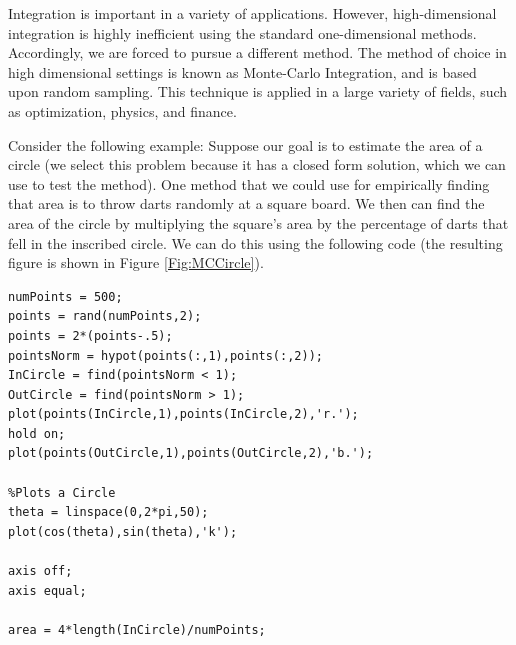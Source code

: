 


Integration is important in a variety of applications. However, high-dimensional integration is highly inefficient using the standard one-dimensional methods. Accordingly, we are forced to pursue a different method. The method of choice in high dimensional settings is known as Monte-Carlo Integration, and is based upon random sampling. This technique is applied in a large variety of fields, such as optimization, physics, and finance.

Consider the following example: Suppose our goal is to estimate the area of a circle (we select this problem because it has a closed form solution, which we can use to test the method). One method that we could use for empirically finding that area is to throw darts randomly at a square board. We then can find the area of the circle by multiplying the square's area by the percentage of darts that fell in the inscribed circle. We can do this using the following code (the resulting figure is shown in Figure \ref{Fig:MCCircle}).

\begin{matlab}
\begin{lstlisting}[style=matlab]
numPoints = 500;
points = rand(numPoints,2);
points = 2*(points-.5);
pointsNorm = hypot(points(:,1),points(:,2));
InCircle = find(pointsNorm < 1);
OutCircle = find(pointsNorm > 1);
plot(points(InCircle,1),points(InCircle,2),'r.');
hold on;
plot(points(OutCircle,1),points(OutCircle,2),'b.');

%Plots a Circle
theta = linspace(0,2*pi,50);
plot(cos(theta),sin(theta),'k');

axis off;
axis equal;

area = 4*length(InCircle)/numPoints;
\end{lstlisting}
\end{matlab}

